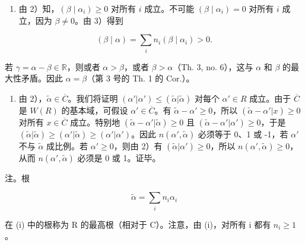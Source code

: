 \begin{enumerate}
\def\labelenumi{\arabic{enumi})}
\setcounter{enumi}{3}
\tightlist
\item
  由 2）知，\((\beta \mid \alpha_i) \geqslant 0\) 对所有 \(i\) 成立。不可能 \((\beta \mid \alpha_i) = 0\) 对所有 \(i\) 成立，因为 \(\beta \neq 0\)。由 3）得到
\end{enumerate}

\[
(\beta \mid \alpha) = \sum_ {i} n _ {i} (\beta \mid \alpha_ {i}) > 0.
\]

若 \(\gamma = \alpha - \beta \in \mathbb{R}\)，则或者 \(\alpha > \beta\)，或者 \(\beta > \alpha\)（Th. 3, no. 6），这与 \(\alpha\) 和 \(\beta\) 的最大性矛盾。因此 \(\alpha = \beta\)（第 3 号的 Th. 1 的 Cor.）。

\begin{enumerate}
\def\labelenumi{\arabic{enumi})}
\setcounter{enumi}{4}
\tightlist
\item
  由 2），\(\tilde{\alpha} \in \overline{C}\)。我们将证明 \((\alpha'|\alpha') \leqslant (\tilde{\alpha}|\tilde{\alpha})\) 对每个 \(\alpha' \in R\) 成立。由于 \(\overline{C}\) 是 \(W(R)\) 的基本域，可假设 \(\alpha' \in \overline{C}\)。有 \(\tilde{\alpha} - \alpha' \geqslant 0\)，所以 \((\tilde{\alpha} - \alpha' | x) \geqslant 0\) 对所有 \(x \in \overline{C}\) 成立。特别地 \((\tilde{\alpha} - \alpha' |\tilde{\alpha}) \geqslant 0\) 且 \((\tilde{\alpha} - \alpha' |\alpha') \geqslant 0\)，于是 \((\tilde{\alpha}|\tilde{\alpha}) \geqslant (\alpha'|\tilde{\alpha}) \geqslant (\alpha'|\alpha')\)。因此 \(n(\alpha',\tilde{\alpha})\) 必须等于 0、1 或 -1，若 \(\alpha'\) 不与 \(\tilde{\alpha}\) 成比例。若 \(\alpha' \geqslant 0\)，则由 2）有 \((\tilde{\alpha}|\alpha') \geqslant 0\)，所以 \(n(\alpha',\tilde{\alpha}) \geqslant 0\)，从而 \(n(\alpha',\tilde{\alpha})\) 必须是 0 或 1。证毕。
\end{enumerate}

注。根

\[
\tilde {\alpha} = \sum_ {i} n _ {i} \alpha_ {i}
\]

在 (i) 中的根称为 R 的最高根（相对于 C）。注意，由 (i)，对所有 i 都有 \(n_{i} \geqslant 1\)。

